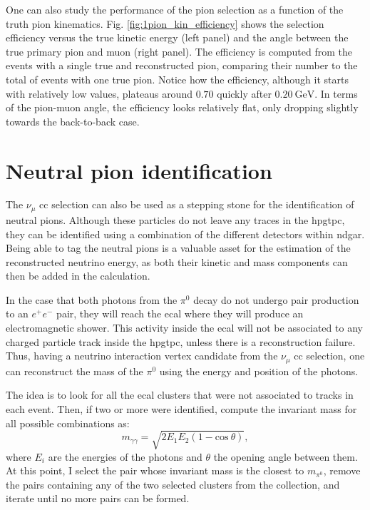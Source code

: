 One can also study the performance of the pion selection as a function of the truth pion kinematics. Fig. \ref{fig:1pion_kin_efficiency} shows the selection efficiency versus the true kinetic energy (left panel) and the angle between the true primary pion and muon (right panel). The efficiency is computed from the events with a single true and reconstructed pion, comparing their number to the total of events with one true pion. Notice how the efficiency, although it starts with relatively low values, plateaus around $0.70$ quickly after $0.20~\mathrm{GeV}$. In terms of the pion-muon angle, the efficiency looks relatively flat, only dropping slightly towards the back-to-back case.

\section{Neutral pion identification}
\label{sec:gar_neutral_pions}

The $\nu_{\mu}$ \gls{cc} selection can also be used as a stepping stone for the identification of neutral pions. Although these particles do not leave any traces in the \gls{hpgtpc}, they can be identified using a combination of the different detectors within \gls{ndgar}. Being able to tag the neutral pions is a valuable asset for the estimation of the reconstructed neutrino energy, as both their kinetic and mass components can then be added in the calculation.

In the case that both photons from the $\pi^{0}$ decay do not undergo pair production to an $e^{+}e^{-}$ pair, they will reach the \gls{ecal} where they will produce an electromagnetic shower. This activity inside the \gls{ecal} will not be associated to any charged particle track inside the \gls{hpgtpc}, unless there is a reconstruction failure. Thus, having a neutrino interaction vertex candidate from the $\nu_{\mu}$ \gls{cc} selection, one can reconstruct the mass of the $\pi^{0}$ using the energy and position of the photons.

The idea is to look for all the \gls{ecal} clusters that were not associated to tracks in each event. Then, if two or more were identified, compute the invariant mass for all possible combinations as:
\begin{equation}
	m_{\gamma\gamma} = \sqrt{2E_{1}E_{2}(1-\mathrm{cos} \ \theta)},
\end{equation}
where $E_{i}$ are the energies of the photons and $\theta$ the opening angle between them. At this point, I select the pair whose invariant mass is the closest to $m_{\pi^{0}}$, remove the pairs containing any of the two selected clusters from the collection, and iterate until no more pairs can be formed.

